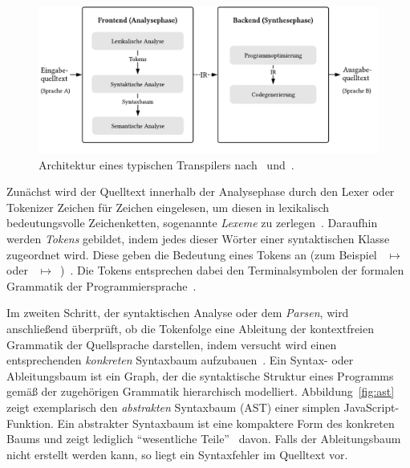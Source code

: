 \begin{figure}[htb]
  \includegraphics[width=\textwidth]{src/2_Grundlagen/fig/transpiler-architecture.pdf}
  \caption{Architektur eines typischen Transpilers nach~\autocite{EVGENIY:2016} und~\autocite[8]{TORCZON:2007}.}
	\label{fig:transpiler-architecture}
\end{figure}

Zunächst wird der Quelltext innerhalb der Analysephase durch den Lexer oder Tokenizer Zeichen für Zeichen eingelesen, um diesen in lexikalisch bedeutungsvolle Zeichenketten, sogenannte \emph{Lexeme} zu zerlegen~\autocite[43]{AHO:COMPILERS}. Daraufhin werden \emph{Tokens} gebildet, indem jedes dieser Wörter einer syntaktischen Klasse zugeordnet wird. Diese geben die Bedeutung eines Tokens an (zum Beispiel ~$\mapsto$~ oder \code{!=}~$\mapsto$~)~\autocite[26]{TORCZON:2007}. Die Tokens entsprechen dabei den Terminalsymbolen der formalen Grammatik der Programmiersprache~\autocite[43]{AHO:COMPILERS}.

Im zweiten Schritt, der syntaktischen Analyse oder dem \emph{Parsen}, wird anschließend überprüft, ob die Tokenfolge eine Ableitung der kontextfreien Grammatik der Quellsprache darstellen, indem versucht wird einen entsprechenden \emph{konkreten} Syntaxbaum aufzubauen~\autocite{SCHOEPP:COMPILER}. Ein Syntax- oder Ableitungsbaum ist ein Graph, der die syntaktische Struktur eines Programms gemäß der zugehörigen Grammatik hierarchisch modelliert. Abbildung~\ref{fig:ast} zeigt exemplarisch den \emph{abstrakten} Syntaxbaum (AST) einer simplen JavaScript-Funktion. Ein abstrakter Syntaxbaum ist eine kompaktere Form des konkreten Baums und zeigt lediglich \enquote{wesentliche Teile}~\autocite[21]{WALDMANN:PPS} davon. Falls der Ableitungsbaum nicht erstellt werden kann, so liegt ein Syntaxfehler im Quelltext vor.

